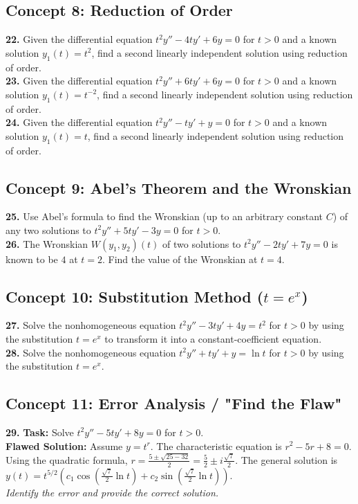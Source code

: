 \documentclass[11pt]{article}
\begin{document}
\subsection*{Concept 8: Reduction of Order}
\textbf{22.} Given the differential equation $t^2 y'' - 4ty' + 6y = 0$ for $t > 0$ and a known solution $y_1(t) = t^2$, find a second linearly independent solution using reduction of order. \\
\textbf{23.} Given the differential equation $t^2 y'' + 6ty' + 6y = 0$ for $t > 0$ and a known solution $y_1(t) = t^{-2}$, find a second linearly independent solution using reduction of order. \\
\textbf{24.} Given the differential equation $t^2 y'' - ty' + y = 0$ for $t > 0$ and a known solution $y_1(t) = t$, find a second linearly independent solution using reduction of order.

\subsection*{Concept 9: Abel's Theorem and the Wronskian}
\textbf{25.} Use Abel's formula to find the Wronskian (up to an arbitrary constant $C$) of any two solutions to $t^2 y'' + 5ty' - 3y = 0$ for $t > 0$. \\
\textbf{26.} The Wronskian $W(y_1, y_2)(t)$ of two solutions to $t^2 y'' - 2ty' + 7y = 0$ is known to be $4$ at $t = 2$. Find the value of the Wronskian at $t = 4$.

\subsection*{Concept 10: Substitution Method ($t = e^x$)}
\textbf{27.} Solve the nonhomogeneous equation $t^2 y'' - 3ty' + 4y = t^2$ for $t > 0$ by using the substitution $t = e^x$ to transform it into a constant-coefficient equation. \\
\textbf{28.} Solve the nonhomogeneous equation $t^2 y'' + ty' + y = \ln t$ for $t > 0$ by using the substitution $t = e^x$.

\subsection*{Concept 11: Error Analysis / "Find the Flaw"}
\textbf{29.} \textbf{Task:} Solve $t^2 y'' - 5ty' + 8y = 0$ for $t > 0$. \\
\textbf{Flawed Solution:} Assume $y = t^r$. The characteristic equation is $r^2 - 5r + 8 = 0$. Using the quadratic formula, $r = \frac{5 \pm \sqrt{25 - 32}}{2} = \frac{5}{2} \pm i\frac{\sqrt{7}}{2}$. The general solution is $y(t) = t^{5/2}\left(c_1 \cos\left(\frac{\sqrt{7}}{2}\ln t\right) + c_2 \sin\left(\frac{\sqrt{7}}{2}\ln t\right)\right)$. \\
\textit{Identify the error and provide the correct solution.}
\end{document}
